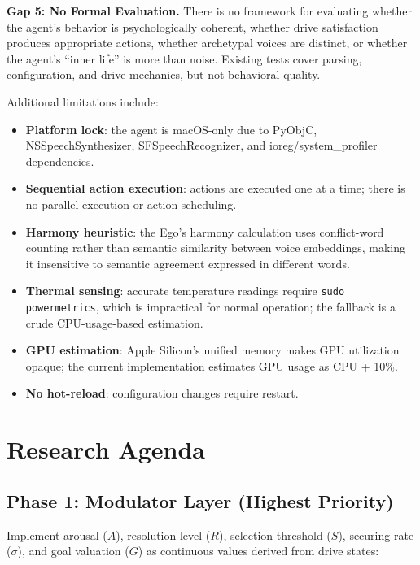 \documentclass[11pt,oneside]{article}
\begin{document}
\begin{gapbox}
\textbf{Gap 5: No Formal Evaluation.}
There is no framework for evaluating whether the agent's behavior is psychologically coherent, whether drive satisfaction produces appropriate actions, whether archetypal voices are distinct, or whether the agent's ``inner life'' is more than noise.
Existing tests cover parsing, configuration, and drive mechanics, but not behavioral quality.
\end{gapbox}

Additional limitations include:

\begin{itemize}
  \item \textbf{Platform lock}: the agent is macOS-only due to PyObjC, NSSpeechSynthesizer, SFSpeechRecognizer, and ioreg/system\_profiler dependencies.
  \item \textbf{Sequential action execution}: actions are executed one at a time; there is no parallel execution or action scheduling.
  \item \textbf{Harmony heuristic}: the Ego's harmony calculation uses conflict-word counting rather than semantic similarity between voice embeddings, making it insensitive to semantic agreement expressed in different words.
  \item \textbf{Thermal sensing}: accurate temperature readings require \texttt{sudo powermetrics}, which is impractical for normal operation; the fallback is a crude CPU-usage-based estimation.
  \item \textbf{GPU estimation}: Apple Silicon's unified memory makes GPU utilization opaque; the current implementation estimates GPU usage as CPU + 10\%.
  \item \textbf{No hot-reload}: configuration changes require restart.
\end{itemize}


\section{Research Agenda}
\label{sec:roadmap}

\subsection{Phase 1: Modulator Layer (Highest Priority)}

Implement arousal ($A$), resolution level ($R$), selection threshold ($S$), securing rate ($\sigma$), and goal valuation ($G$) as continuous values derived from drive states:
\end{document}
